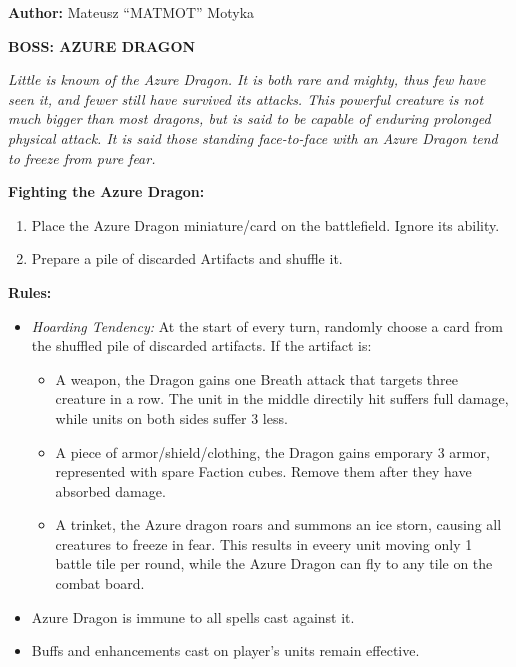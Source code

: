 

\textbf{Author:} Mateusz ``MATMOT'' Motyka

\pagebreak

\begin{minipage}{0.3\textwidth}
\end{minipage}
\begin{minipage}{0.7\textwidth}
  \textbf{\MakeUppercase{Boss: Azure Dragon}}

  \medskip

  \textit{Little is known of the Azure Dragon.
    It is both rare and mighty, thus few have seen it, and fewer still have survived its attacks.
    This powerful creature is not much bigger than most dragons, but is said to be capable of enduring prolonged physical attack.
    It is said those standing face-to-face with an Azure Dragon tend to freeze from pure fear.
  }

  \medskip

  \textbf{Fighting the Azure Dragon:}
  \begin{enumerate}
    \item Place the Azure Dragon miniature/card on the battlefield.
      Ignore its ability.
    \item Prepare a pile of discarded Artifacts and shuffle it.
  \end{enumerate}

  \medskip

  \textbf{Rules:}
  \begin{itemize}
    \item \textit{Hoarding Tendency:} At the start of every turn, randomly choose a card from the shuffled pile of discarded artifacts.
      If the artifact is:
      \begin{itemize}[leftmargin=15pt]
        \item A weapon, the Dragon gains one Breath attack that targets three creature in a row.
          The unit in the middle directily hit suffers full damage, while units on both sides suffer 3  less.
        \item A piece of armor/shield/clothing, the Dragon gains emporary 3 armor, represented with spare Faction cubes.
          Remove them after they have absorbed damage.
        \item A trinket, the Azure dragon roars and summons an ice storn, causing all creatures to freeze in fear.
          This results in eveery unit moving only 1 battle tile per round, while the Azure Dragon can fly to any tile on the combat board.
      \end{itemize}
    \item Azure Dragon is immune to all spells cast against it.
    \item Buffs and enhancements cast on player's units remain effective.
  \end{itemize}
\end{minipage}

